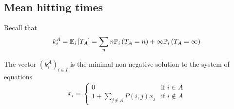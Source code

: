 \subsection{Mean hitting times}
Recall that
\begin{align*}
	k_i^A = \mathbb{E}_{i}\left[{T_A}\right] = \sum_n n \mathbb{P}_{i}\left({T_A = n}\right) + \infty \mathbb{P}_{i}\left({T_A = \infty}\right)
\end{align*}
\begin{theorem}
	The vector $(k_i^A)_{i \in I}$ is the minimal non-negative solution to the system of equations
	\begin{align*}
		x_i = \begin{cases}
			0 & \text{if } i \in A \\
			1 + \sum_{j \not\in A} P(i,j) x_j & \text{if } i \not\in A
		\end{cases}
	\end{align*}
\end{theorem}

